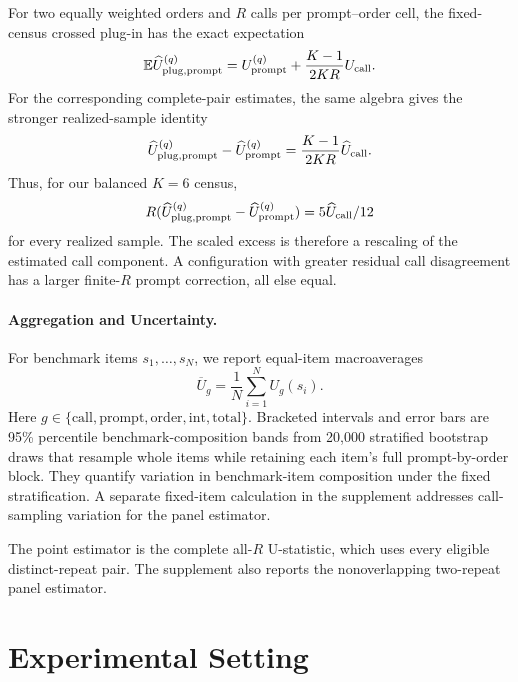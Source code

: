 \documentclass[letterpaper]{article}
\newcommand{\E}{\mathbb E}
\newcommand{\1}{\mathbf 1}
\newcommand{\Up}{U_{\mathrm{prompt}}}
\newcommand{\Uc}{U_{\mathrm{call}}}
\begin{document}
For two equally weighted orders and $R$ calls per prompt--order cell, the
fixed-census crossed plug-in has the exact expectation
\begin{equation}
\E\widehat U_{\rm plug,prompt}^{(q)}
=\Up^{(q)}+\frac{K-1}{2KR}\Uc.
\label{eq:crossed-plugin-excess}
\end{equation}
For the corresponding complete-pair estimates, the same algebra gives the
stronger realized-sample identity
\begin{equation}
\widehat U_{\rm plug,prompt}^{(q)}-\widehat\Up^{(q)}
=\frac{K-1}{2KR}\widehat\Uc .
\label{eq:crossed-plugin-sample-identity}
\end{equation}
Thus, for our balanced $K=6$ census,
\begin{equation}
R(\widehat U_{\rm plug,prompt}^{(q)}-\widehat\Up^{(q)})=5\widehat\Uc/12 
\label{eq:crossed-plugin-scaled-identity}
\end{equation}
for every realized sample. The scaled excess is therefore a rescaling of the
estimated call component. A configuration with greater residual call
disagreement has a larger finite-$R$ prompt correction, all else equal.

\paragraph{Aggregation and Uncertainty.}

For benchmark items $s_1,\ldots,s_N$, we report equal-item macroaverages
\begin{equation}
\overline U_g=\frac1N\sum_{i=1}^NU_g(s_i).
\end{equation}
Here $g\in\{\mathrm{call},\mathrm{prompt},\mathrm{order},
\mathrm{int},\mathrm{total}\}$.
Bracketed intervals and error bars are 95\% percentile benchmark-composition
bands from 20,000 stratified bootstrap draws that resample whole items while
retaining each item's full prompt-by-order block. They quantify variation in
benchmark-item composition under the fixed stratification. A separate fixed-item calculation in
the supplement addresses call-sampling variation for the panel estimator.

The point estimator is the complete all-$R$ U-statistic, which uses every
eligible distinct-repeat pair. The supplement also reports the nonoverlapping
two-repeat panel estimator.

\section{Experimental Setting}
\end{document}
